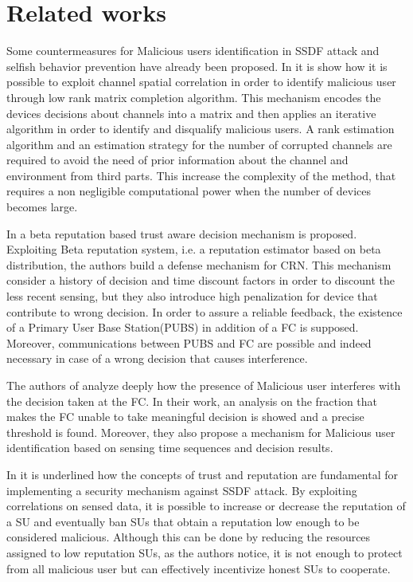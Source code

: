 \documentclass[letterpaper, 10 pt, conference]{ieeeconf}  %
\begin{document}
\section{Related works}
\label{sec2}
Some countermeasures for Malicious users identification in SSDF attack and selfish behavior prevention have already been proposed. In \cite{qingao} it is show how it is possible to exploit channel spatial correlation in order to identify malicious user through low rank matrix completion algorithm. This mechanism encodes the devices decisions about channels into a matrix and then applies an iterative algorithm in order to identify and disqualify malicious users. A rank estimation algorithm and an estimation strategy for the number of corrupted channels are required to avoid the need of prior information about the channel and environment from third parts. This increase the complexity of the method, that requires a non negligible computational power when the number of devices becomes large.
    
In \cite{taoqin} a beta reputation based trust aware decision mechanism is proposed. Exploiting Beta reputation system, i.e. a reputation estimator based on beta distribution, the authors build a defense mechanism for CRN. This mechanism consider a history of decision and time discount factors in order to discount the less recent sensing, but they also introduce high penalization for device that contribute to wrong decision. In order to assure a reliable feedback, the existence of a Primary User Base Station(PUBS) in addition of a FC is supposed. Moreover, communications between PUBS and FC are possible and indeed necessary in case of a wrong decision that causes interference.

The authors of \cite{rawat} analyze deeply how the presence of Malicious user interferes with the decision taken at the FC. In their work, an analysis on the fraction that makes the FC unable to take meaningful decision is showed and a precise threshold is found. Moreover, they also propose a mechanism for Malicious user identification based on sensing time sequences and decision results.

In \cite{leon} it is underlined how the concepts of trust and reputation are fundamental for implementing a security mechanism against SSDF attack. By exploiting correlations on sensed data, it is possible to increase or decrease the reputation of a SU and eventually ban SUs that obtain a reputation low enough to be considered malicious. Although this can be done by reducing the resources assigned to low reputation SUs, as the authors notice, it is not enough to protect from all malicious user but can effectively incentivize honest SUs to cooperate.
\end{document}
